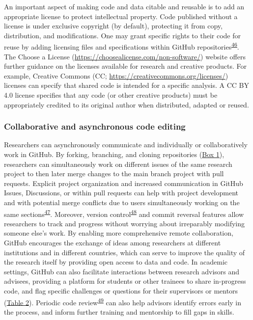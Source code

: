 An important aspect of making code and data citable and reusable is to add an appropriate license to protect intellectual property.
Code published without a license is under exclusive copyright (by default), protecting it from copy, distribution, and modifications.
One may grant specific rights to their code for reuse by adding licensing files and specifications within GitHub repositories\textsuperscript{\protect\hyperlink{ref-TOsASkn5}{46}}.
The Choose a License (\url{https://choosealicense.com/non-software/}) website offers further guidance on the licenses available for research and creative products.
For example, Creative Commons (CC; \url{https://creativecommons.org/licenses/}) licenses can specify that shared code is intended for a specific analysis.
A CC BY 4.0 license specifies that any code (or other creative products) must be appropriately credited to its original author when distributed, adapted or reused.

\hypertarget{collaborative-and-asynchronous-code-editing}{%
\subsubsection{Collaborative and asynchronous code editing}\label{collaborative-and-asynchronous-code-editing}}

Researchers can asynchronously communicate and individually or collaboratively work in GitHub.
By forking, branching, and cloning repositories (\protect\hyperlink{definitions}{Box 1}), researchers can simultaneously work on different issues of the same research project to then later merge changes to the main branch project with pull requests.
Explicit project organization and increased communication in GitHub Issues, Discussions, or within pull requests can help with project development and with potential merge conflicts due to users simultaneously working on the same sections\textsuperscript{\protect\hyperlink{ref-1BJcvyTmV}{47}}.
Moreover, version control\textsuperscript{\protect\hyperlink{ref-K7nbP1Ty}{48}} and commit reversal features allow researchers to track and progress without worrying about irreparably modifying someone else's work.
By enabling more comprehensive remote collaboration, GitHub encourages the exchange of ideas among researchers at different institutions and in different countries, which can serve to improve the quality of the research itself by providing open access to data and code.
In academic settings, GitHub can also facilitate interactions between research advisors and advisees, providing a platform for students or other trainees to share in-progress code, and flag specific challenges or questions for their supervisors or mentors (\protect\hyperlink{tbl:roles}{Table 2}).
Periodic code review\textsuperscript{\protect\hyperlink{ref-hm9PaCLD}{49}} can also help advisors identify errors early in the process, and inform further training and mentorship to fill gaps in skills.

